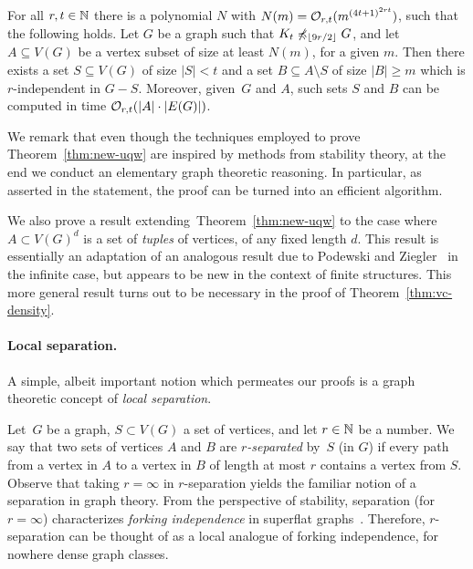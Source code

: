 \begin{theorem}\label{thm:new-uqw}
For all $r,t\in \mathbb{N}$ there is a polynomial  $N$%
with $N(m)=
\mathcal{O}_{r,t}{(m^{{(4t+1)}^{2rt}})}$, such that the following holds.
Let $G$ be a graph such that $K_t\not\preccurlyeq_{\lfloor 9r/2\rfloor} G$, and
let $A\subseteq V(G)$ be a vertex subset of size at least $N(m)$, for a given $m$.
Then there exists a set $S\subseteq V(G)$ of size $|S|<t$ and a set $B\subseteq A\setminus S$ 
of size $|B|\geq m$ which is $r$-independent in $G-S$.
Moreover, given~$G$ and $A$, such sets $S$ and $B$ can be computed in time $\mathcal{O}_{r,t}(|A|\cdot |E(G)|)$. 
\end{theorem}

We remark
that even though the techniques employed to prove Theorem~\ref{thm:new-uqw} are inspired by methods from stability theory, 
at the end we conduct an elementary graph theoretic reasoning. In particular, as asserted in the statement, the
proof can be turned into an efficient algorithm.

We also prove a result extending~Theorem~\ref{thm:new-uqw}
to the case where $A\subset V(G)^d$ is a set of \emph{tuples} of vertices, of any fixed length $d$.
This result is essentially an adaptation of an analogous result due to Podewski and Ziegler~\cite{podewski1978stable} in the infinite case,
but appears to be new in the context of finite structures.
This more general result turns out to be necessary in the proof of Theorem~\ref{thm:vc-density}.

\paragraph{Local separation.}
A simple, albeit important notion which permeates our proofs
is a graph theoretic concept of \emph{local separation}.

Let~$G$ be a graph, $S\subset V(G)$ a set of vertices,
and let $r\in \mathbb{N}$ be a number. We say that two  sets of vertices $A$ and $B$  are \emph{$r$-separated} by~$S$ (in $G$) if every path from a vertex in $A$ to a vertex in $B$
of length at most $r$ contains a vertex from $S$. %
 Observe that taking $r=\infty$ in $r$-separation yields the familiar notion of a separation in graph theory.
From the perspective of stability, separation (for $r=\infty$) characterizes \emph{forking independence} in superflat graphs~\cite{ivanov}. Therefore,
$r$-separation can be thought of as a local analogue of forking independence, for nowhere dense graph classes.

